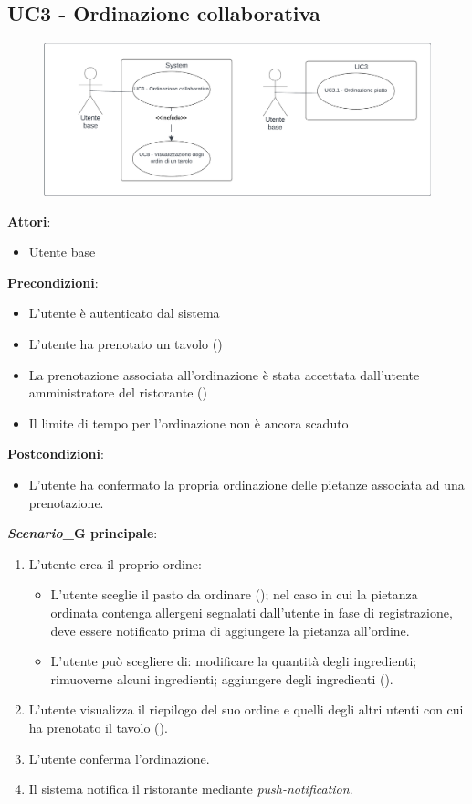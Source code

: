 \subsection{UC3 - Ordinazione collaborativa}\label{usecase:3}

\begin{figure}[H]
    \centering
    \includegraphics[width=0.9\linewidth]{ucd/UCD3_nuovo.png}
\end{figure}

\textbf{Attori}:
\begin{itemize}
    \item Utente base
\end{itemize}
\textbf{Precondizioni}:
\begin{itemize}
    \item L'utente è autenticato dal sistema 
    \item L'utente ha prenotato un tavolo ()
    \item La prenotazione associata all'ordinazione è stata accettata dall'utente amministratore del ristorante ()
    \item Il limite di tempo per l'ordinazione non è ancora scaduto
\end{itemize}
\textbf{Postcondizioni}:
\begin{itemize}
    \item L'utente ha confermato la propria ordinazione delle pietanze associata ad una prenotazione.
\end{itemize}
\textbf{\textit{Scenario}_G principale}:
\begin{enumerate}
    \item L'utente crea il proprio ordine:
    \begin{itemize}
    \item L'utente sceglie il pasto da ordinare (); nel caso in cui la pietanza ordinata contenga allergeni segnalati dall'utente in fase di registrazione, deve essere notificato prima di  aggiungere la pietanza all'ordine.
    \item L'utente può scegliere di: modificare la quantità degli ingredienti; rimuoverne alcuni ingredienti; aggiungere degli ingredienti ().
    \end{itemize}
    \item L'utente visualizza il riepilogo del suo ordine e quelli degli altri utenti con cui ha prenotato il tavolo ().
    \item L'utente conferma l'ordinazione.
    \item Il sistema notifica il ristorante mediante \textit{push-notification}.
\end{enumerate}


